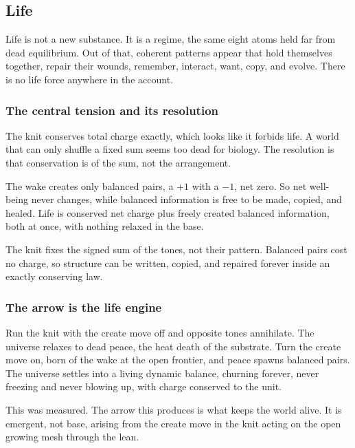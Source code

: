 \subsection{Life}

Life is not a new substance. It is a regime, the same eight atoms held far from dead equilibrium. Out of that, coherent patterns appear that hold themselves together, repair their wounds, remember, interact, want, copy, and evolve. There is no life force anywhere in the account.

\subsubsection{The central tension and its resolution}

The knit conserves total charge exactly, which looks like it forbids life. A world that can only shuffle a fixed sum seems too dead for biology. The resolution is that conservation is of the sum, not the arrangement.

The wake creates only balanced pairs, a $+1$ with a $-1$, net zero. So net well-being never changes, while balanced information is free to be made, copied, and healed. Life is conserved net charge plus freely created balanced information, both at once, with nothing relaxed in the base.

\begin{principle}
The knit fixes the signed sum of the tones, not their pattern. Balanced pairs cost no charge, so structure can be written, copied, and repaired forever inside an exactly conserving law.
\end{principle}

\subsubsection{The arrow is the life engine}

Run the knit with the create move off and opposite tones annihilate. The universe relaxes to dead peace, the heat death of the substrate. Turn the create move on, born of the wake at the open frontier, and peace spawns balanced pairs. The universe settles into a living dynamic balance, churning forever, never freezing and never blowing up, with charge conserved to the unit.

This was measured. The arrow this produces is what keeps the world alive. It is emergent, not base, arising from the create move in the knit acting on the open growing mesh through the lean.

